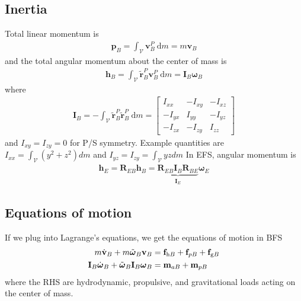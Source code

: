 \documentclass[10pt]{article}
\newcommand{\mbf}[1]{\mathbf{#1}}
\newcommand{\mcal}[1]{\mathcal{#1}}  %
\newcommand{\be}{\begin{eqnarray}}
\newcommand{\ee}{\end{eqnarray}}
\newcommand{\ben}{\begin{eqnarray*}}
\newcommand{\een}{\end{eqnarray*}}
\newcommand{\tn}[1]{\textnormal{#1}}
\begin{document}
\subsection{Inertia}
Total linear momentum is
\ben
\mbf{p}_B=\int_{\mathcal{V}} \mbf{v}_B^P \mathrm{~d} m
= m \mbf{v}_B
\een
and the total angular momentum about the center of mass is
\ben
\mbf{h}_B=\int_{\mathcal{V}} \tilde{\mbf{r}}_B^P \mbf{v}_B^P \mathrm{~d} m
= \mbf{I}_B \boldsymbol{\omega}_B
\een
%
where
\ben
\mbf{I}_B=-\int_{\mathcal{V}} \tilde{\mbf{r}}_B^P \tilde{\mbf{r}}_B^P \mathrm{~d} m=\left[\begin{array}{ccc}
        I_{x x}  & -I_{x y} & -I_{x z} \\
        -I_{y x} & I_{y y}  & -I_{y z} \\
        -I_{z x} & -I_{z y} & I_{z z}
    \end{array}\right]
\een
and $I_{xy} = I_{zy} = 0$ for P/S symmetry.
Example quantities are $\textstyle I_{xx} = \int_{\mcal{V}}\left(y^2+z^2\right) dm$ and $\textstyle I_{yz}=I_{zy}=\int_{\mcal{V}} yz dm$
In EFS, angular momentum is
\ben
\mbf{h}_E=\mbf{R}_{E B} \mbf{h}_B= \underbrace{\mbf{R}_{E B} \mbf{I}_B \mbf{R}_{B E}}_{\mbf{I}_E} \boldsymbol{\omega}_E
\een
\subsection{Equations of motion}
% 
If we plug into Lagrange's equations, we get the equations of motion in BFS
%
\begin{align}
    m\dot{\mbf{v}}_B + m \tilde{\boldsymbol{\omega}}_B\mbf{v}_B                                         & =  \mbf{f}_{\tn{h}B} + \mbf{f}_{pB}  + \mbf{f}_{\tn{g}B} \\
    \mbf{I}_B \dot{\boldsymbol{\omega}}_B+\tilde{\boldsymbol{\omega}}_B \mbf{I}_B \boldsymbol{\omega}_B & = \mbf{m}_{a B}+\mbf{m}_{p B}
\end{align}
where the RHS are hydrodynamic, propulsive, and gravitational loads acting on the center of mass.
% 
\end{document}
